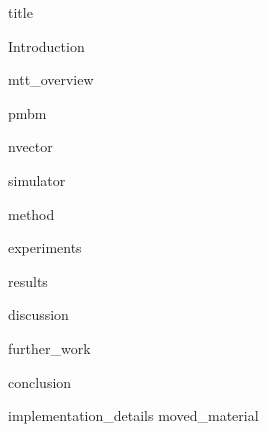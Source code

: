 \documentclass{article}
\begin{document}
{title}

\newpage

\thispagestyle{empty} %

\newpage

\frontmatter

\tableofcontents

\listoffigures
\listoftables

\mainmatter

{Introduction}

\newpage
{mtt_overview}

\newpage
{pmbm}

\newpage
{nvector}

\newpage
{simulator}

\newpage
{method}

\newpage
{experiments}

\newpage
{results}

\newpage
{discussion}

\newpage
{further_work}

\newpage
{conclusion}
\newpage
\printbibliography[heading = bibintoc, title = Bibliography]    %

\addappendix
{implementation_details}
{moved_material}

\end{document}
